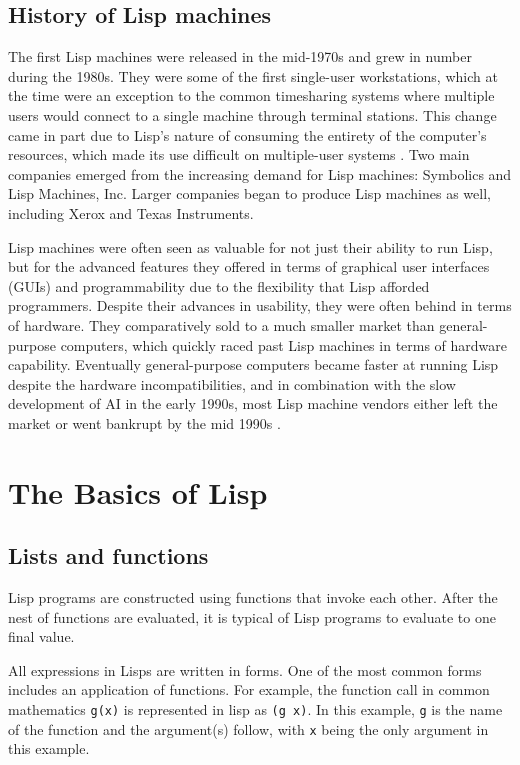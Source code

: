 \documentclass[journal]{IEEEtran}
\begin{document}
\subsection{History of Lisp machines}
The first Lisp machines were released in the mid-1970s and grew in number during the 1980s. They were some of the first single-user workstations, which at the time were an exception to the common timesharing systems where multiple users would connect to a single machine through terminal stations. This change came in part due to Lisp's nature of consuming the entirety of the computer's resources, which made its use difficult on multiple-user systems \cite{andromeda}. Two main companies emerged from the increasing demand for Lisp machines: Symbolics and Lisp Machines, Inc. Larger companies began to produce Lisp machines as well, including Xerox and Texas Instruments. 

Lisp machines were often seen as valuable for not just their ability to run Lisp, but for the advanced features they offered in terms of graphical user interfaces (GUIs) and programmability due to the flexibility that Lisp afforded programmers. Despite their advances in usability, they were often behind in terms of hardware. They comparatively sold to a much smaller market than general-purpose computers, which quickly raced past Lisp machines in terms of hardware capability. Eventually general-purpose computers became faster at running Lisp despite the hardware incompatibilities, and in combination with the slow development of AI in the early 1990s, most Lisp machine vendors either left the market or went bankrupt by the mid 1990s \cite{withington}.

\section{The Basics of Lisp}

\subsection{Lists and functions}
Lisp programs are constructed using functions that invoke each other. After the nest of functions are evaluated, it is typical of Lisp programs to evaluate to one final value.

All expressions in Lisps are written in forms. One of the most common forms includes an application of functions. For example, the function call in common mathematics \texttt{g(x)} is represented in lisp as \texttt{(g x)}. In this example, \texttt{g} is the name of the function and the argument(s) follow, with \texttt{x} being the only argument in this example.
\end{document}
